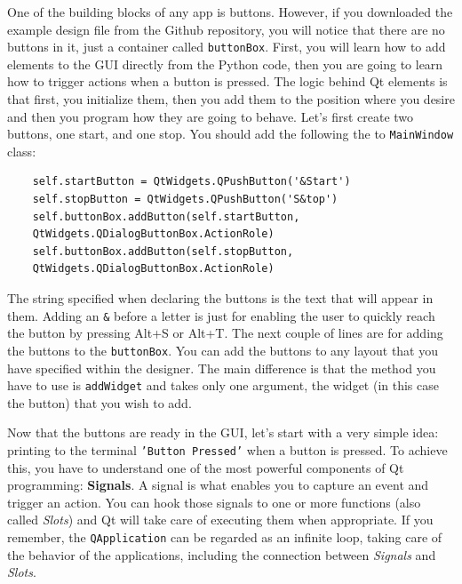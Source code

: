 One of the building blocks of any app is buttons. However, if you
downloaded the example design file from the Github repository, you will
notice that there are no buttons in it, just a container called
\texttt{buttonBox}. First, you will learn how to add elements to the
{GUI} directly from the Python code, then you are going to learn how to
trigger actions when a button is pressed. The logic behind Qt elements
is that first, you initialize them, then you add them to the position
where you desire and then you program how they are going to behave.
Let's first create two buttons, one start, and one stop. You should add
the following the to \texttt{MainWindow} class:

\begin{verbatim}
    self.startButton = QtWidgets.QPushButton('&Start')
    self.stopButton = QtWidgets.QPushButton('S&top')
    self.buttonBox.addButton(self.startButton,
    QtWidgets.QDialogButtonBox.ActionRole)
    self.buttonBox.addButton(self.stopButton,
    QtWidgets.QDialogButtonBox.ActionRole)
\end{verbatim}

The string specified when declaring the buttons is the text that will
appear in them. Adding an \texttt{\&} before a letter is just for
enabling the user to quickly reach the button by pressing Alt+S or Alt+T.
The next couple of lines are for adding the buttons to the
\texttt{buttonBox}. You can add the buttons to any layout that you have
specified within the designer. The main difference is that the method
you have to use is \texttt{addWidget} and takes only one argument, the
widget (in this case the button) that you wish to add.


Now that the buttons are ready in the {GUI}, let's start with a very
simple idea: printing to the terminal \texttt{'Button Pressed'} when a button
is pressed. To achieve this, you have to understand one of the most
powerful components of Qt programming: \textbf{Signals}. A signal is
what enables you to capture an event and trigger an action. You can hook
those signals to one or more functions (also called \emph{Slots}) and Qt
will take care of executing them when appropriate. If you remember, the
\texttt{QApplication} can be regarded as an infinite loop, taking care
of the behavior of the applications, including the connection between
\emph{Signals} and \emph{Slots}.

